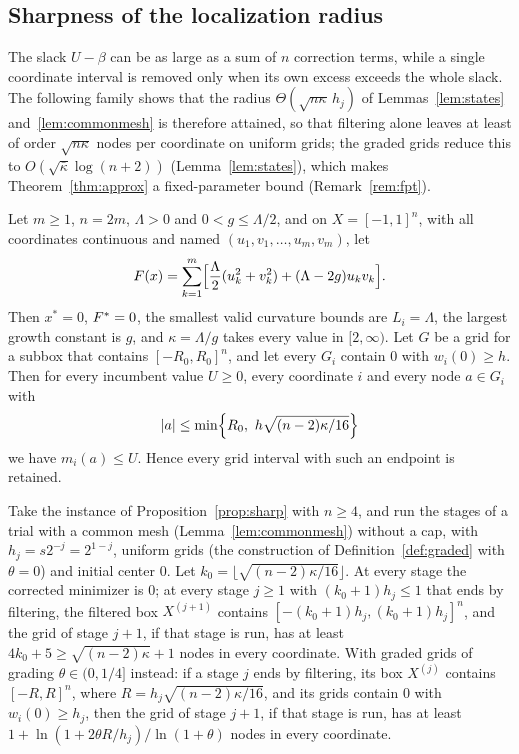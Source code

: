 \subsection{Sharpness of the localization radius}
The slack $U-\beta$ can be as large as a sum of $n$ correction terms,
while a single coordinate interval is removed only when its own excess
exceeds the whole slack. The following family shows that the radius
$\Theta(\sqrt{n\kappa}\,h_j)$ of Lemmas~\ref{lem:states}
and~\ref{lem:commonmesh} is therefore attained, so that filtering alone
leaves at least of order $\sqrt{n\kappa}$ nodes per coordinate on uniform
grids; the graded grids reduce this to
$O(\sqrt{\bar\kappa}\log(n+2))$ (Lemma~\ref{lem:states}), which makes
Theorem~\ref{thm:approx} a fixed-parameter bound (Remark~\ref{rem:fpt}).

\begin{proposition}\label{prop:sharp}
Let $m\ge1$, $n=2m$, $\Lambda>0$ and $0<g\le\Lambda/2$, and on
$X=[-1,1]^n$, with all coordinates continuous and named
$(u_1,v_1,\dots,u_m,v_m)$, let
\[
F(x)=\sum_{k=1}^m\Bigl[\frac\Lambda2(u_k^2+v_k^2)+(\Lambda-2g)u_kv_k\Bigr].
\]
Then $x^*=0$, $F^{*}=0$, the smallest valid curvature bounds are
$L_i=\Lambda$, the largest growth constant is $g$, and $\kappa=\Lambda/g$
takes every value in $[2,\infty)$. Let $G$ be a grid for a subbox that
contains $[-R_0,R_0]^n$, and let every $G_i$ contain $0$ with
$w_i(0)\ge h$. Then for every incumbent value $U\ge0$, every coordinate $i$
and every node $a\in G_i$ with
\[
|a|\le\min\Bigl\{R_0,\ h\sqrt{(n-2)\kappa/16}\Bigr\}
\]
we have $m_i(a)\le U$. Hence every grid interval with such an endpoint is
retained.
\end{proposition}

\begin{corollary}
\label{cor:uniformgrid}
Take the instance of Proposition~\ref{prop:sharp} with $n\ge4$, and run the
stages of a trial with a common mesh (Lemma~\ref{lem:commonmesh}) without a
cap, with $h_j=s2^{-j}=2^{1-j}$, uniform grids (the construction of
Definition~\ref{def:graded} with $\theta=0$) and initial center $0$. Let
$k_0=\lfloor\sqrt{(n-2)\kappa/16}\rfloor$. At every stage the corrected
minimizer is $0$; at every stage $j\ge1$ with $(k_0+1)h_j\le1$ that ends by
filtering, the filtered box $X^{(j+1)}$ contains
$[-(k_0+1)h_j,(k_0+1)h_j]^n$, and the grid of stage $j+1$, if that stage is
run, has at least $4k_0+5\ge\sqrt{(n-2)\kappa}+1$ nodes in every coordinate.
With graded grids of grading $\theta\in(0,1/4]$ instead: if a stage $j$ ends
by filtering, its box $X^{(j)}$ contains $[-R,R]^n$, where
$R=h_j\sqrt{(n-2)\kappa/16}$, and its grids contain $0$ with
$w_i(0)\ge h_j$, then the grid of stage $j+1$, if that stage is run, has at
least $1+\ln(1+2\theta R/h_j)/\ln(1+\theta)$ nodes in every coordinate.
\end{corollary}

